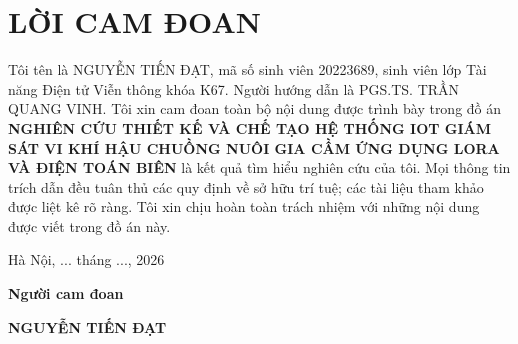 \section*{LỜI CAM ĐOAN}
\thispagestyle{empty}
Tôi tên là NGUYỄN TIẾN ĐẠT, mã số sinh viên 20223689, sinh viên lớp Tài năng Điện tử Viễn thông khóa K67. Người hướng dẫn là PGS.TS. TRẦN QUANG VINH. Tôi xin cam đoan toàn bộ nội dung được trình bày trong đồ án \textbf{NGHIÊN CỨU THIẾT KẾ VÀ CHẾ TẠO HỆ THỐNG IOT
GIÁM SÁT VI KHÍ HẬU CHUỒNG NUÔI GIA CẦM ỨNG
DỤNG LORA VÀ ĐIỆN TOÁN BIÊN} là kết quả tìm hiểu nghiên cứu của tôi. Mọi thông tin trích dẫn đều tuân thủ các quy định về sở hữu trí tuệ; các tài liệu tham khảo được liệt kê rõ ràng. Tôi xin chịu hoàn toàn trách nhiệm với những nội dung được viết trong đồ án này.

\vspace{6pt}
\hspace{8.3cm}Hà Nội, ... tháng ..., 2026

\hspace{9cm}\textbf{Người cam đoan}

\vspace{2cm}
\hspace{8.85cm}\textbf{NGUYỄN TIẾN ĐẠT}
\cleardoublepage